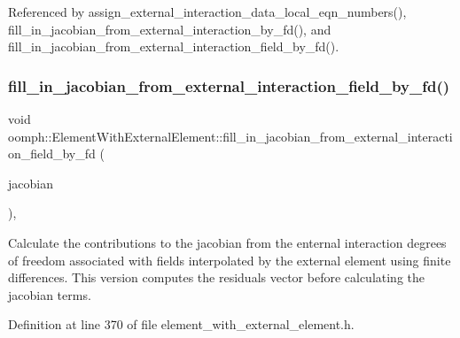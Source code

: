 Referenced by assign\+\_\+external\+\_\+interaction\+\_\+data\+\_\+local\+\_\+eqn\+\_\+numbers(), fill\+\_\+in\+\_\+jacobian\+\_\+from\+\_\+external\+\_\+interaction\+\_\+by\+\_\+fd(), and fill\+\_\+in\+\_\+jacobian\+\_\+from\+\_\+external\+\_\+interaction\+\_\+field\+\_\+by\+\_\+fd().

\mbox{\label{classoomph_1_1ElementWithExternalElement_a4a1a2b23e08881c57488b27da45d4ef0}} 
\subsubsection{\texorpdfstring{fill\+\_\+in\+\_\+jacobian\+\_\+from\+\_\+external\+\_\+interaction\+\_\+field\+\_\+by\+\_\+fd()}{fill\_in\_jacobian\_from\_external\_interaction\_field\_by\_fd()}\hspace{0.1cm}{\footnotesize\ttfamily [2/2]}}
{\footnotesize\ttfamily void oomph\+::\+Element\+With\+External\+Element\+::fill\+\_\+in\+\_\+jacobian\+\_\+from\+\_\+external\+\_\+interaction\+\_\+field\+\_\+by\+\_\+fd (\begin{DoxyParamCaption}\item[{\hyperlink{classoomph_1_1DenseMatrix}{Dense\+Matrix}$<$ double $>$ \&}]{jacobian }\end{DoxyParamCaption})\hspace{0.3cm}{\ttfamily [inline]}, {\ttfamily [protected]}}



Calculate the contributions to the jacobian from the enternal interaction degrees of freedom associated with fields interpolated by the external element using finite differences. This version computes the residuals vector before calculating the jacobian terms. 



Definition at line 370 of file element\+\_\+with\+\_\+external\+\_\+element.\+h.



